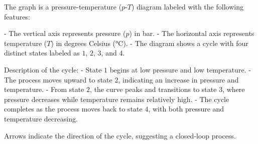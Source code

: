 The graph is a pressure-temperature (\( p \)-\( T \)) diagram labeled with the following features:  

- The vertical axis represents pressure (\( p \)) in bar.  
- The horizontal axis represents temperature (\( T \)) in degrees Celsius (\( \text{°C} \)).  
- The diagram shows a cycle with four distinct states labeled as \( 1 \), \( 2 \), \( 3 \), and \( 4 \).  

Description of the cycle:  
- State \( 1 \) begins at low pressure and low temperature.  
- The process moves upward to state \( 2 \), indicating an increase in pressure and temperature.  
- From state \( 2 \), the curve peaks and transitions to state \( 3 \), where pressure decreases while temperature remains relatively high.  
- The cycle completes as the process moves back to state \( 4 \), with both pressure and temperature decreasing.  

Arrows indicate the direction of the cycle, suggesting a closed-loop process.